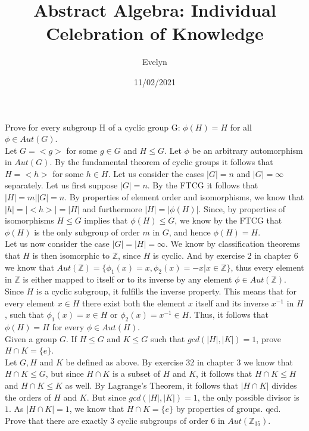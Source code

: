 \documentclass{article}
\title{Abstract Algebra: Individual Celebration of Knowledge}
\author{Evelyn}
\date{11/02/2021}
\newcommand{\Z}{\mathbb{Z}}
\begin{document}
\maketitle

 Prove for every subgroup H of a cyclic group G: $\phi(H)=H$ for all $\phi \in Aut(G)$. \\

 Let $G=<g>$ for some $g \in G$ and $H \leq G$. Let $\phi$ be an arbitrary automorphism in $Aut(G)$. By the fundamental theorem of cyclic groups it follows that $H=<h>$ for some $h \in H$. Let us consider the cases $|G|=n$ and $|G|=\infty$ separately. Let us first suppose $|G|=n$. By the FTCG it follows that $|H|=m \big| |G|=n$. By properties of element order and isomorphisms, we know that $|h|=|<h>|=|H|$ and furthermore $|H|=|\phi(H)|$. Since, by properties of isomorphisms $H \leq G$ implies that $\phi(H) \leq G$, we know by the FTCG that $\phi(H)$ is the only subgroup of order $m$ in $G$, and hence $\phi(H)=H$. \\

Let us now consider the case $|G|=|H|=\infty$. We know by classification theorems that $H$ is then isomorphic to $\Z$, since $H$ is cyclic. And by exercise 2 in chapter 6 we know that $Aut(\Z)=\{\phi_1(x)=x, \phi_2(x)=-x|x \in \Z\}$, thus every element in $\Z$ is either mapped to itself or to its inverse by any element $\phi \in Aut(\Z)$. Since $H$ is a cyclic subgroup, it fulfills the inverse property. This means that for every element $x \in H$ there exist  both the element $x$ itself and its inverse $x^{-1}$ in $H$, such that $\phi_1(x)=x \in H$ or $\phi_2(x)=x^{-1} \in H$. Thus, it follows that $\phi(H)=H$ for every $\phi \in Aut(H)$. \\

 Given a group $G$. If $H \leq G$ and $K \leq G$ such that $gcd(|H|,|K|)=1$, prove $H \cap K = \{e\}$. \\

 Let $G, H$ and $K$ be defined as above. By exercise 32 in chapter 3 we know that $H \cap K \leq G$, but since $H \cap K$ is a subset of $H$ and $K$, it follows that $H \cap K \leq H$ and $H \cap K \leq K$ as well. By Lagrange's Theorem, it follows that $|H \cap K|$ divides the orders of $H$ and $K$. But since $gcd(|H|,|K|)=1$, the only possible divisor is $1$. As $|H \cap K|=1$, we know that $H \cap K = \{e\}$ by properties of groups. qed. \\

 Prove that there are exactly 3 cyclic subgroups of order 6 in $Aut(\Z_{35})$. 
\end{document}
